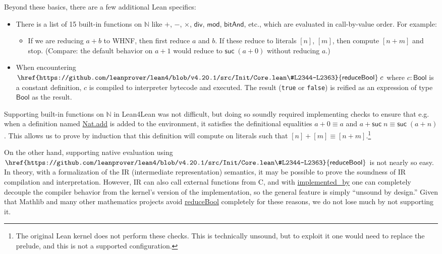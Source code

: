 \documentclass[sigplan,10pt,screen]{acmart}\settopmatter{printfolios=true,printccs=false,printacmref=false}
\newcommand{\N}{\mathbb{N}}
\newcommand{\lfl}{\textsf{Lean4Lean}\xspace}
\newcommand{\code}[1]{\mbox{\ttfamily\small #1}}
\begin{document}
\noindent Beyond these basics, there are a few additional Lean specifics:
\begin{itemize}
  \item There is a list of 15 built-in functions on $\N$ like $+$, $-$, $\times$, $\mathsf{div}$, $\mathsf{mod}$, $\mathsf{bitAnd}$, etc., which are evaluated in call-by-value order. For example:
  \begin{itemize}
    \item If we are reducing $a+b$ to WHNF, then first reduce $a$ and $b$. If these reduce to literals $[n]$, $[m]$, then compute $[n+m]$ and stop. (Compare: the default behavior on $a+1$ would reduce to $\mathsf{suc}\;(a+0)$ without reducing $a$.)
  \end{itemize}
  \item When encountering $\mathsf{\href{https://github.com/leanprover/lean4/blob/v4.20.1/src/Init/Core.lean\#L2344-L2363}{reduceBool}}\;c$ where $c:\mathsf{Bool}$ is a constant definition, $c$ is compiled to interpreter bytecode and executed. The result (\lstinline|true| or \lstinline|false|) is reified as an expression of type $\mathsf{Bool}$ as the result.
\end{itemize}

Supporting built-in functions on $\N$ in \lfl was not difficult, but doing so soundly required implementing checks to ensure that e.g. when a definition named \href{https://github.com/leanprover/lean4/blob/v4.20.1/src/Init/Prelude.lean#L1639-L1648}{\code{Nat.add}} is added to the environment, it satisfies the definitional equalities $a+0\equiv a$ and $a+\mathsf{suc}\;n\equiv \mathsf{suc}\;(a+n)$. This allows us to prove by induction that this definition will compute on literals such that $[n]+[m]\equiv[n+m]$.\footnote{The original Lean kernel does not perform these checks. This is technically unsound, but to exploit it one would need to replace the prelude, and this is not a supported configuration.}

On the other hand, supporting native evaluation using $\mathsf{\href{https://github.com/leanprover/lean4/blob/v4.20.1/src/Init/Core.lean\#L2344-L2363}{reduceBool}}$ is not nearly so easy. In theory, with a formalization of the IR (intermediate representation) semantics, it may be possible to prove the soundness of IR compilation and interpretation. However, IR can also call external functions from C, and with \href{https://github.com/leanprover/lean4/blob/v4.20.1/src/Lean/Compiler/ImplementedByAttr.lean#L14}{\code{implemented\_by}} one can completely decouple the compiler behavior from the kernel's version of the implementation, so the general feature is simply ``unsound by design.'' Given that \textsf{Mathlib} and many other mathematics projects avoid \href{https://github.com/leanprover/lean4/blob/v4.20.1/src/Init/Core.lean#L2344-L2363}{\textsf{reduceBool}} completely for these reasons, we do not lose much by not supporting it.
\end{document}
